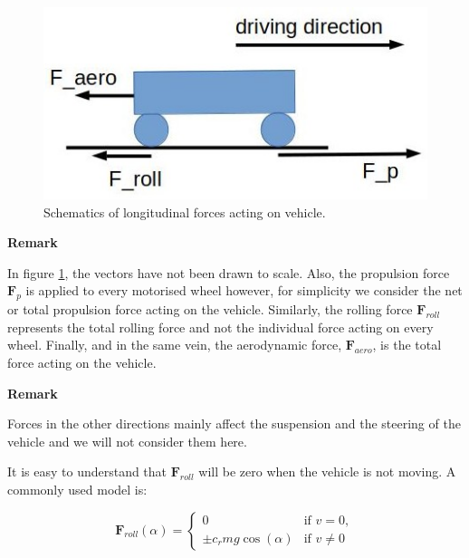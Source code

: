 \begin{figure}[!htb]
\begin{center}
\includegraphics[scale=0.280]{img/physics/flat_road_vehicle_diagram.jpg}
\end{center}
\caption{Schematics of longitudinal forces acting on vehicle.}
\label{flat_road_vehicle_diagram}
\end{figure}

\begin{framed}

\textbf{Remark}

In figure \ref{flat_road_vehicle_diagram}, the vectors have not been drawn to scale. Also, the propulsion force $\mathbf{F}_{p}$ is applied to every motorised wheel however, for simplicity we consider the net or total propulsion force acting on the vehicle. Similarly, the rolling force $\mathbf{F}_{roll}$ represents the total rolling force and not the individual force acting on every wheel. Finally, and in the same vein, the aerodynamic force, $\mathbf{F}_{aero}$,  is the total force acting on the vehicle.

\end{framed}

\begin{framed}

\textbf{Remark}

Forces in the other directions mainly affect the suspension and the steering of the vehicle and we will not consider them here.

\end{framed}

It is easy to understand that $\mathbf{F}_{roll}$ will be zero when the vehicle is not moving. A commonly used model is:


\begin{equation}
\mathbf{F}_{roll}(\alpha) = \left\{
\begin{array}{rl}
	0 & \text{if } v = 0,\\
	\pm c_rmg\cos(\alpha) & \text{if } v \neq 0 
\end{array} \right.
\end{equation}

